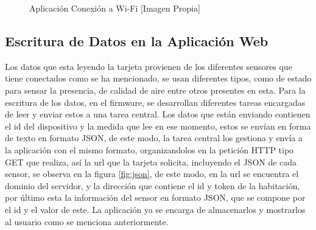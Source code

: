 \begin{figure}[H]
	\centering
	\caption{Aplicación Conexión a Wi-Fi [Imagen Propia]}
	\label{fig:wifi}
\end{figure}

\subsection{Escritura de Datos en la Aplicación Web}

Los datos que esta leyendo la tarjeta provienen de los diferentes sensores que tiene conectados como se ha mencionado, se usan diferentes tipos, como de estado para sensar la presencia, de calidad de aire entre otros presentes en esta. Para la escritura de los datos, en el firmware, se desarrollan diferentes tareas encargadas de leer y enviar estos a una tarea central. Los datos que están enviando contienen el id del dispositivo y la medida que lee en ese momento, estos se envían en forma de texto en formato JSON, de este modo, la tarea central los gestiona y envía a la aplicación con el mismo formato, organizandolos en la petición HTTP tipo GET que realiza, así la url que la tarjeta solicita, incluyendo el JSON de cada sensor, se observa en la figura \ref{fig:json}, de este modo, en la url se encuentra el dominio del servidor, y la dirección que contiene el id y token de la habitación, por último esta la información del sensor en formato JSON, que se compone por el id y el valor de este. La aplicación ya se encarga de almacenarlos y mostrarlos al usuario como se menciona anteriormente.

